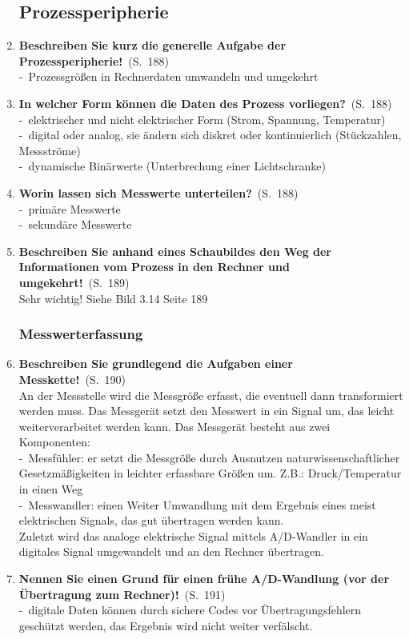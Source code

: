 \documentclass[a4paper,12pt]{article}
\newcommand{\question}[3]{\pagebreak[3]\item {\textbf{#1?}}\ (S.\ #2)#3}
\newcommand{\statement}[3]{\pagebreak[3]\item {\textbf{#1!}}\ (S.\ #2)#3}
\newcommand{\catchword}[1]{\\-\ #1}
\newcommand{\normaltext}[1]{\\#1}
\newcommand{\page}[1]{#1}
\begin{document}
\begin{enumerate}
  \subsection{Prozessperipherie}

  \statement{Beschreiben Sie kurz die generelle Aufgabe der Prozessperipherie}{\page{188}}
  {
    \catchword{Prozessgrößen in Rechnerdaten umwandeln und umgekehrt}
  }

  \question{In welcher Form können die Daten des Prozess vorliegen}{\page{188}}
  {
    \catchword{elektrischer und nicht elektrischer Form (Strom, Spannung, Temperatur)}
    \catchword{digital oder analog, sie ändern sich diskret oder kontinuierlich (Stückzahlen, Messströme)}
    \catchword{dynamische Binärwerte (Unterbrechung einer Lichtschranke)}
  }

  \question{Worin lassen sich Messwerte unterteilen}{\page{188}}
  {
    \catchword{primäre Messwerte}
    \catchword{sekundäre Messwerte}
  }

  \statement{Beschreiben Sie anhand eines Schaubildes den Weg der Informationen
             vom Prozess in den Rechner und umgekehrt}{\page{189}}
  {
    \normaltext{Sehr wichtig! Siehe Bild 3.14 Seite 189}
  }

  \subsubsection{Messwerterfassung}

  \statement{Beschreiben Sie grundlegend die Aufgaben einer Messkette}{\page{190}}
  {
    \normaltext{An der Messstelle wird die Messgröße erfasst, die eventuell dann 
               transformiert werden muss. Das Messgerät setzt den Messwert in ein Signal
               um, das leicht weiterverarbeitet werden kann. Das Messgerät besteht
               aus zwei Komponenten:}
    \catchword{Messfühler: er setzt die Messgröße durch Ausnutzen naturwissenschaftlicher
               Gesetzmäßigkeiten in leichter erfassbare Größen um. Z.B.: Druck/Temperatur in einen Weg} 
    \catchword{Messwandler: einen Weiter Umwandlung mit dem Ergebnis eines meist elektrischen
               Signals, das gut übertragen werden kann.}
    \normaltext{Zuletzt wird das analoge elektrische Signal mittels A/D-Wandler in ein digitales
                Signal umgewandelt und an den Rechner übertragen.}
  }

  \statement{Nennen Sie einen Grund für einen frühe A/D-Wandlung
             (vor der Übertragung zum Rechner)}{\page{191}}
  {
    \catchword{digitale Daten können durch sichere Codes vor Übertragungsfehlern geschützt werden,
               das Ergebnis wird nicht weiter verfälscht.} 
  }


\end{enumerate}
\end{document}

